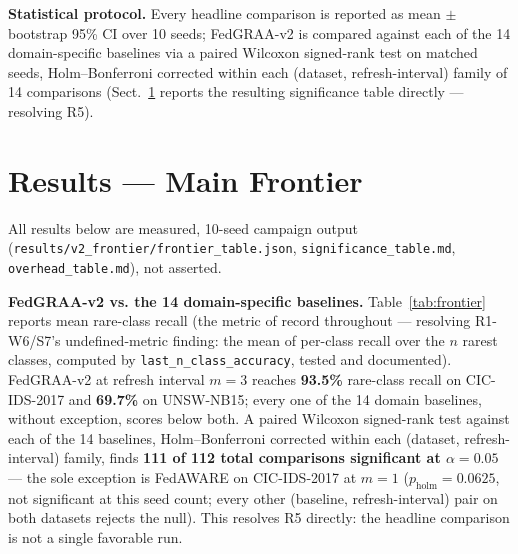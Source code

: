 \documentclass{llncs}
\begin{document}
\textbf{Statistical protocol.} Every headline comparison is reported as mean $\pm$ bootstrap 95\% CI over 10 seeds; FedGRAA-v2 is compared against each of the 14 domain-specific baselines via a paired Wilcoxon signed-rank test on matched seeds, Holm--Bonferroni corrected within each (dataset, refresh-interval) family of 14 comparisons (Sect.~\ref{sec:results} reports the resulting significance table directly --- resolving R5).

\section{Results --- Main Frontier}
\label{sec:results}

All results below are measured, 10-seed campaign output (\texttt{results/v2\_frontier/frontier\_table.json}, \texttt{significance\_table.md}, \texttt{overhead\_table.md}), not asserted.

\textbf{FedGRAA-v2 vs. the 14 domain-specific baselines.} Table~\ref{tab:frontier} reports mean rare-class recall (the metric of record throughout --- resolving R1-W6/S7's undefined-metric finding: the mean of per-class recall over the $n$ rarest classes, computed by \texttt{last\_n\_class\_accuracy}, tested and documented). FedGRAA-v2 at refresh interval $m=3$ reaches \textbf{93.5\%} rare-class recall on CIC-IDS-2017 and \textbf{69.7\%} on UNSW-NB15; every one of the 14 domain baselines, without exception, scores below both. A paired Wilcoxon signed-rank test against each of the 14 baselines, Holm--Bonferroni corrected within each (dataset, refresh-interval) family, finds \textbf{111 of 112 total comparisons significant at $\alpha=0.05$} --- the sole exception is FedAWARE on CIC-IDS-2017 at $m=1$ ($p_{\text{holm}}=0.0625$, not significant at this seed count; every other (baseline, refresh-interval) pair on both datasets rejects the null). This resolves R5 directly: the headline comparison is not a single favorable run.
\end{document}
